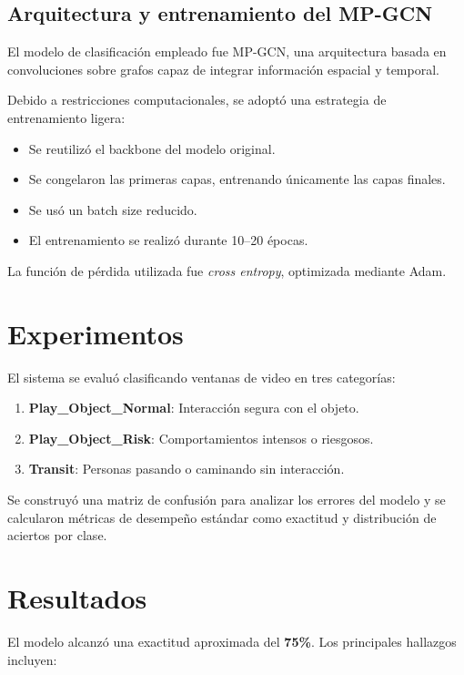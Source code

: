 \documentclass{article}
\begin{document}
\subsection{Arquitectura y entrenamiento del MP-GCN}

El modelo de clasificación empleado fue MP-GCN, una arquitectura basada en convoluciones sobre grafos capaz de integrar información espacial y temporal.

Debido a restricciones computacionales, se adoptó una estrategia de entrenamiento ligera:

\begin{itemize}
    \item Se reutilizó el backbone del modelo original.
    \item Se congelaron las primeras capas, entrenando únicamente las capas finales.
    \item Se usó un batch size reducido.
    \item El entrenamiento se realizó durante 10–20 épocas.
\end{itemize}

La función de pérdida utilizada fue \emph{cross entropy}, optimizada mediante Adam.

\section{Experimentos}

El sistema se evaluó clasificando ventanas de video en tres categorías:

\begin{enumerate}
    \item \textbf{Play\_Object\_Normal}: Interacción segura con el objeto.
    \item \textbf{Play\_Object\_Risk}: Comportamientos intensos o riesgosos.
    \item \textbf{Transit}: Personas pasando o caminando sin interacción.
\end{enumerate}

Se construyó una matriz de confusión para analizar los errores del modelo y se calcularon métricas de desempeño estándar como exactitud y distribución de aciertos por clase.

\section{Resultados}

El modelo alcanzó una exactitud aproximada del \textbf{75\%}. Los principales hallazgos incluyen:
\end{document}
